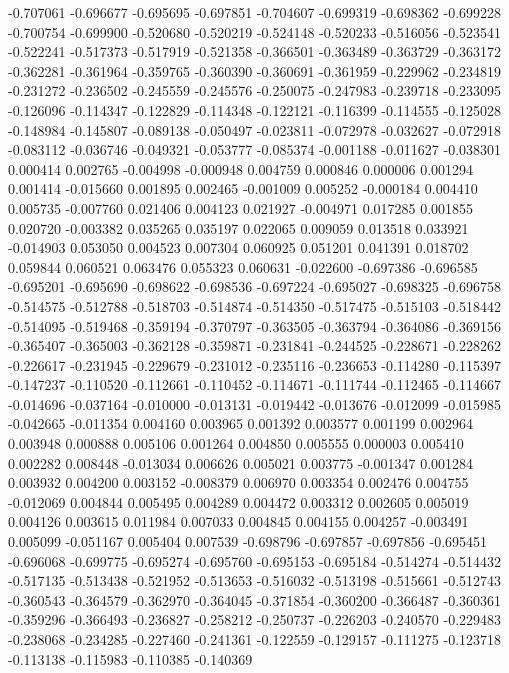 -0.707061
-0.696677
-0.695695
-0.697851
-0.704607
-0.699319
-0.698362
-0.699228
-0.700754
-0.699900
-0.520680
-0.520219
-0.524148
-0.520233
-0.516056
-0.523541
-0.522241
-0.517373
-0.517919
-0.521358
-0.366501
-0.363489
-0.363729
-0.363172
-0.362281
-0.361964
-0.359765
-0.360390
-0.360691
-0.361959
-0.229962
-0.234819
-0.231272
-0.236502
-0.245559
-0.245576
-0.250075
-0.247983
-0.239718
-0.233095
-0.126096
-0.114347
-0.122829
-0.114348
-0.122121
-0.116399
-0.114555
-0.125028
-0.148984
-0.145807
-0.089138
-0.050497
-0.023811
-0.072978
-0.032627
-0.072918
-0.083112
-0.036746
-0.049321
-0.053777
-0.085374
-0.001188
-0.011627
-0.038301
0.000414
0.002765
-0.004998
-0.000948
0.004759
0.000846
0.000006
0.001294
0.001414
-0.015660
0.001895
0.002465
-0.001009
0.005252
-0.000184
0.004410
0.005735
-0.007760
0.021406
0.004123
0.021927
-0.004971
0.017285
0.001855
0.020720
-0.003382
0.035265
0.035197
0.022065
0.009059
0.013518
0.033921
-0.014903
0.053050
0.004523
0.007304
0.060925
0.051201
0.041391
0.018702
0.059844
0.060521
0.063476
0.055323
0.060631
-0.022600
-0.697386
-0.696585
-0.695201
-0.695690
-0.698622
-0.698536
-0.697224
-0.695027
-0.698325
-0.696758
-0.514575
-0.512788
-0.518703
-0.514874
-0.514350
-0.517475
-0.515103
-0.518442
-0.514095
-0.519468
-0.359194
-0.370797
-0.363505
-0.363794
-0.364086
-0.369156
-0.365407
-0.365003
-0.362128
-0.359871
-0.231841
-0.244525
-0.228671
-0.228262
-0.226617
-0.231945
-0.229679
-0.231012
-0.235116
-0.236653
-0.114280
-0.115397
-0.147237
-0.110520
-0.112661
-0.110452
-0.114671
-0.111744
-0.112465
-0.114667
-0.014696
-0.037164
-0.010000
-0.013131
-0.019442
-0.013676
-0.012099
-0.015985
-0.042665
-0.011354
0.004160
0.003965
0.001392
0.003577
0.001199
0.002964
0.003948
0.000888
0.005106
0.001264
0.004850
0.005555
0.000003
0.005410
0.002282
0.008448
-0.013034
0.006626
0.005021
0.003775
-0.001347
0.001284
0.003932
0.004200
0.003152
-0.008379
0.006970
0.003354
0.002476
0.004755
-0.012069
0.004844
0.005495
0.004289
0.004472
0.003312
0.002605
0.005019
0.004126
0.003615
0.011984
0.007033
0.004845
0.004155
0.004257
-0.003491
0.005099
-0.051167
0.005404
0.007539
-0.698796
-0.697857
-0.697856
-0.695451
-0.696068
-0.699775
-0.695274
-0.695760
-0.695153
-0.695184
-0.514274
-0.514432
-0.517135
-0.513438
-0.521952
-0.513653
-0.516032
-0.513198
-0.515661
-0.512743
-0.360543
-0.364579
-0.362970
-0.364045
-0.371854
-0.360200
-0.366487
-0.360361
-0.359296
-0.366493
-0.236827
-0.258212
-0.250737
-0.226203
-0.240570
-0.229483
-0.238068
-0.234285
-0.227460
-0.241361
-0.122559
-0.129157
-0.111275
-0.123718
-0.113138
-0.115983
-0.110385
-0.140369
